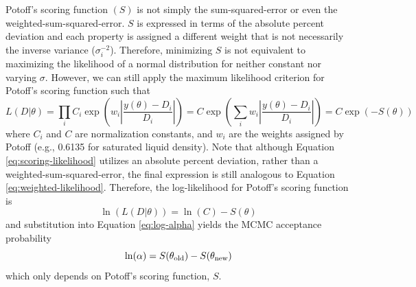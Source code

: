 \documentclass[preprint,review,11pt]{elsarticle}
\begin{document}
	
	Potoff's scoring function $(S)$ is not simply the sum-squared-error or even the weighted-sum-squared-error. $S$ is expressed in terms of the absolute percent deviation and each property is assigned a different weight that is not necessarily the inverse variance ($\sigma_i^{-2}$). Therefore, minimizing $S$ is not equivalent to maximizing the likelihood of a normal distribution for neither constant nor varying $\sigma$. However, we can still apply the maximum likelihood criterion for Potoff's scoring function such that
	\begin{equation} \label{eq:scoring-likelihood}
	L(D|\theta) = \prod_i C_i \exp\left(w_i\left|\frac{y(\theta)-D_i}{D_i}\right|\right) = C \exp\left(\sum_i w_i\left|\frac{y(\theta)-D_i}{D_i}\right|\right) = C \exp\left(-S(\theta)\right)
	\end{equation}
	where $C_i$ and $C$ are normalization constants, and $w_i$ are the weights assigned by Potoff (e.g., 0.6135 for saturated liquid density). Note that although Equation \ref{eq:scoring-likelihood} utilizes an absolute percent deviation, rather than a weighted-sum-squared-error, the final expression is still analogous to Equation \ref{eq:weighted-likelihood}. Therefore, the log-likelihood for Potoff's scoring function is
	\begin{equation}
	\ln(L(D|\theta)) = \ln(C) -S(\theta)
	\end{equation}
	and substitution into Equation \ref{eq:log-alpha} yields the MCMC acceptance probability
	\begin{equation} \label{eq:log-score}
	\ln(\alpha) = S(\theta_{\rm old}) - S(\theta_{\rm new})
	\end{equation}
	which only depends on Potoff's scoring function, $S$.
	
\end{document}
